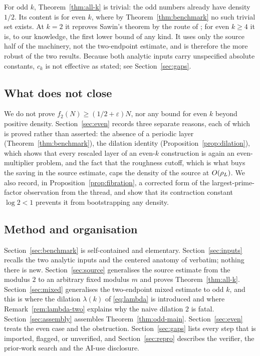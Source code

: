\documentclass[11pt]{article}
\begin{document}
For odd \(k\), Theorem~\ref{thm:all-k} is trivial: the odd numbers already
have density \(1/2\). Its content is for even \(k\), where by
Theorem~\ref{thm:benchmark} no such trivial set exists. At \(k=2\) it reproves
Sawin's theorem by the route of \cite[\S4]{DellaPietra2026}; for even
\(k\geq4\) it is, to our knowledge, the first lower bound of any kind. It uses
only the source half of the machinery, not the two-endpoint estimate, and is
therefore the more robust of the two results. Because both
analytic inputs carry unspecified absolute constants, \(c_k\) is not
effective as stated; see Section~\ref{sec:gaps}.

\subsection{What does not close}

We do not prove \(f_2(N)\geq(1/2+\varepsilon)N\), nor any bound for even \(k\)
beyond positive density. Section~\ref{sec:even} records three separate reasons,
each of which is proved rather than asserted: the absence of a periodic
layer (Theorem~\ref{thm:benchmark}), the dilation identity
(Proposition~\ref{prop:dilation}), which shows that every rescaled layer of an even-\(k\)
construction is again an even-multiplier problem, and the fact that the
roughness cutoff, which is what buys the saving in the source estimate, caps
the density of the source at \(O(\rho_L)\). We also record, in
Proposition~\ref{prop:fibration}, a corrected form of the largest-prime-factor
observation from the thread, and show that its contraction constant
\(\log2<1\) prevents it from bootstrapping any density.

\subsection{Method and organisation}

Section~\ref{sec:benchmark} is self-contained and elementary. Section~\ref{sec:inputs}
recalls the two analytic inputs and the centered anatomy of
\cite{DellaPietra2026} verbatim; nothing there is new.
Section~\ref{sec:source} generalises the source estimate from the modulus \(2\) to an
arbitrary fixed modulus \(m\) and proves Theorem~\ref{thm:all-k}.
Section~\ref{sec:mixed} generalises the two-endpoint mixed estimate to odd
\(k\), and this is where the dilation \(\lambda(k)\) of \eqref{eq:lambda} is
introduced and where Remark~\ref{rem:lambda-two} explains why the naive
dilation \(2\) is fatal. Section~\ref{sec:assembly} assembles
Theorem~\ref{thm:odd-main}. Section~\ref{sec:even} treats the
even case and the obstruction. Section~\ref{sec:gaps} lists every step that is
imported, flagged, or unverified, and Section~\ref{sec:repro} describes the
verifier, the prior-work search and the AI-use disclosure.
\end{document}
